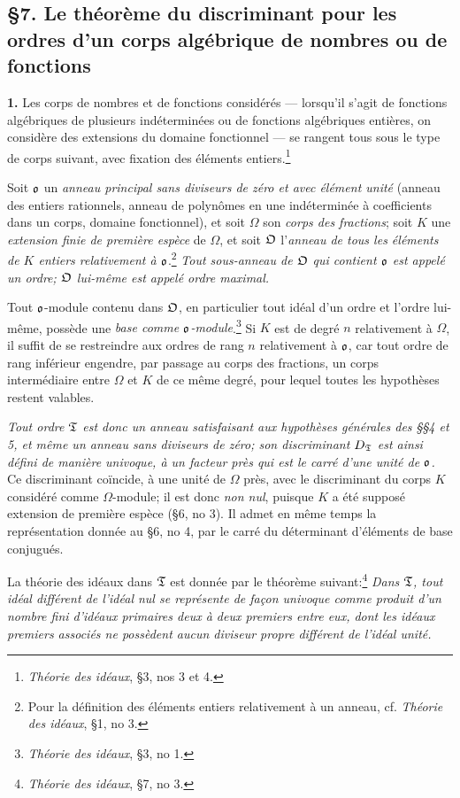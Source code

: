 \subsection*{\S 7. Le théorème du discriminant pour les ordres d'un corps algébrique de nombres ou de fonctions}

\textbf{1.} Les corps de nombres et de fonctions considérés --- lorsqu'il s'agit de fonctions algébriques de plusieurs indéterminées ou de fonctions algébriques entières, on considère des extensions du domaine fonctionnel --- se rangent tous sous le type de corps suivant, avec fixation des éléments entiers.\footnote{\emph{Théorie des idéaux}, \S 3, nos 3 et 4.}

Soit $\mathfrak o$ un \emph{anneau principal sans diviseurs de zéro et avec élément unité} (anneau des entiers rationnels, anneau de polynômes en une indéterminée à coefficients dans un corps, domaine fonctionnel), et soit $\Omega$ son \emph{corps des fractions}; soit $K$ une \emph{extension finie de première espèce} de $\Omega$, et soit $\mathfrak O$ l'\emph{anneau de tous les éléments de $K$ entiers relativement à $\mathfrak o$}.\footnote{Pour la définition des éléments entiers relativement à un anneau, cf. \emph{Théorie des idéaux}, \S 1, no 3.} \emph{Tout sous-anneau de $\mathfrak O$ qui contient $\mathfrak o$ est appelé un ordre; $\mathfrak O$ lui-même est appelé ordre maximal.}

Tout $\mathfrak o$-module contenu dans $\mathfrak O$, en particulier tout idéal d'un ordre et l'ordre lui-même, possède une \emph{base comme $\mathfrak o$-module}.\footnote{\emph{Théorie des idéaux}, \S 3, no 1.} Si $K$ est de degré $n$ relativement à $\Omega$, il suffit de se restreindre aux ordres de rang $n$ relativement à $\mathfrak o$, car tout ordre de rang inférieur engendre, par passage au corps des fractions, un corps intermédiaire entre $\Omega$ et $K$ de ce même degré, pour lequel toutes les hypothèses restent valables.

\emph{Tout ordre $\mathfrak T$ est donc un anneau satisfaisant aux hypothèses générales des \S\S 4 et 5, et même un anneau sans diviseurs de zéro; son discriminant $D_\mathfrak T$ est ainsi défini de manière univoque, à un facteur près qui est le carré d'une unité de $\mathfrak o$.} Ce discriminant coïncide, à une unité de $\Omega$ près, avec le discriminant du corps $K$ considéré comme $\Omega$-module; il est donc \emph{non nul}, puisque $K$ a été supposé extension de première espèce (\S 6, no 3). Il admet en même temps la représentation donnée au \S 6, no 4, par le carré du déterminant d'éléments de base conjugués.

La théorie des idéaux dans $\mathfrak T$ est donnée par le théorème suivant:\footnote{\emph{Théorie des idéaux}, \S 7, no 3.} \emph{Dans $\mathfrak T$, tout idéal différent de l'idéal nul se représente de façon univoque comme produit d'un nombre fini d'idéaux primaires deux à deux premiers entre eux, dont les idéaux premiers associés ne possèdent aucun diviseur propre différent de l'idéal unité.}

